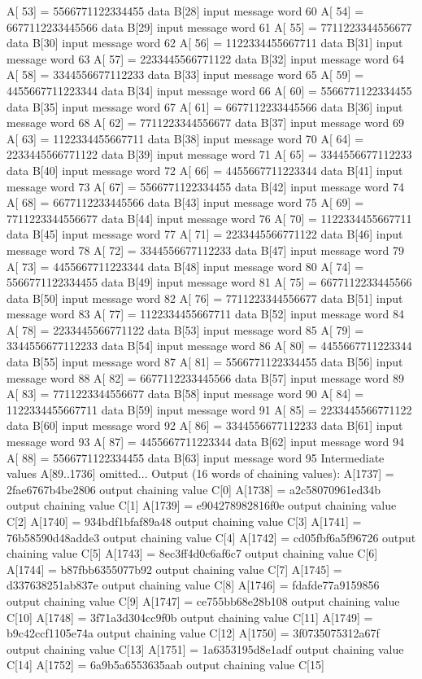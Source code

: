 A[  53] = 5566771122334455 data B[28] input message word   60
A[  54] = 6677112233445566 data B[29] input message word   61
A[  55] = 7711223344556677 data B[30] input message word   62
A[  56] = 1122334455667711 data B[31] input message word   63
A[  57] = 2233445566771122 data B[32] input message word   64
A[  58] = 3344556677112233 data B[33] input message word   65
A[  59] = 4455667711223344 data B[34] input message word   66
A[  60] = 5566771122334455 data B[35] input message word   67
A[  61] = 6677112233445566 data B[36] input message word   68
A[  62] = 7711223344556677 data B[37] input message word   69
A[  63] = 1122334455667711 data B[38] input message word   70
A[  64] = 2233445566771122 data B[39] input message word   71
A[  65] = 3344556677112233 data B[40] input message word   72
A[  66] = 4455667711223344 data B[41] input message word   73
A[  67] = 5566771122334455 data B[42] input message word   74
A[  68] = 6677112233445566 data B[43] input message word   75
A[  69] = 7711223344556677 data B[44] input message word   76
A[  70] = 1122334455667711 data B[45] input message word   77
A[  71] = 2233445566771122 data B[46] input message word   78
A[  72] = 3344556677112233 data B[47] input message word   79
A[  73] = 4455667711223344 data B[48] input message word   80
A[  74] = 5566771122334455 data B[49] input message word   81
A[  75] = 6677112233445566 data B[50] input message word   82
A[  76] = 7711223344556677 data B[51] input message word   83
A[  77] = 1122334455667711 data B[52] input message word   84
A[  78] = 2233445566771122 data B[53] input message word   85
A[  79] = 3344556677112233 data B[54] input message word   86
A[  80] = 4455667711223344 data B[55] input message word   87
A[  81] = 5566771122334455 data B[56] input message word   88
A[  82] = 6677112233445566 data B[57] input message word   89
A[  83] = 7711223344556677 data B[58] input message word   90
A[  84] = 1122334455667711 data B[59] input message word   91
A[  85] = 2233445566771122 data B[60] input message word   92
A[  86] = 3344556677112233 data B[61] input message word   93
A[  87] = 4455667711223344 data B[62] input message word   94
A[  88] = 5566771122334455 data B[63] input message word   95
Intermediate values A[89..1736] omitted... 
Output (16 words of chaining values):
A[1737] = 2fae6767b4be2806 output chaining value C[0]
A[1738] = a2c58070961ed34b output chaining value C[1]
A[1739] = e904278982816f0e output chaining value C[2]
A[1740] = 934bdf1bfaf89a48 output chaining value C[3]
A[1741] = 76b58590d48adde3 output chaining value C[4]
A[1742] = cd05fbf6a5f96726 output chaining value C[5]
A[1743] = 8ec3ff4d0c6af6c7 output chaining value C[6]
A[1744] = b87fbb6355077b92 output chaining value C[7]
A[1745] = d337638251ab837e output chaining value C[8]
A[1746] = fdafde77a9159856 output chaining value C[9]
A[1747] = ce755bb68e28b108 output chaining value C[10]
A[1748] = 3f71a3d304cc9f0b output chaining value C[11]
A[1749] = b9c42ccf1105e74a output chaining value C[12]
A[1750] = 3f0735075312a67f output chaining value C[13]
A[1751] = 1a6353195d8e1adf output chaining value C[14]
A[1752] = 6a9b5a6553635aab output chaining value C[15]

